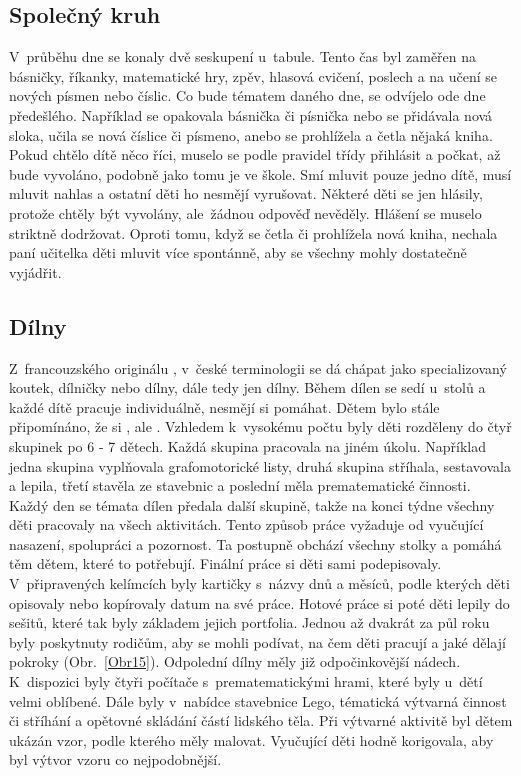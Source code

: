 			\subsection{Společný kruh}
			V průběhu dne se konaly dvě seskupení u~tabule. Tento čas byl zaměřen na básničky, říkanky, matematické hry, zpěv, hlasová cvičení, poslech a na učení se nových písmen nebo číslic. Co bude tématem daného dne, se odvíjelo ode dne předešlého. Například se opakovala básnička či písnička nebo se přidávala nová sloka, učila se nová číslice či písmeno, anebo se prohlížela a četla nějaká kniha. Pokud chtělo dítě něco říci, muselo se podle pravidel třídy přihlásit a počkat, až bude vyvoláno, podobně jako tomu je ve škole. Smí mluvit pouze jedno dítě, musí mluvit nahlas a ostatní děti ho nesmějí vyrušovat. Některé děti se jen hlásily, protože chtěly být vyvolány, ale žádnou odpověď nevěděly. Hlášení se muselo striktně dodržovat. Oproti tomu, když se četla či prohlížela nová kniha, nechala paní učitelka děti mluvit více spontánně, aby se všechny mohly dostatečně vyjádřit.

		\subsection{Dílny}
		\label{dilny}
			Z~francouzského originálu , v~české terminologii se dá chápat jako specializovaný koutek, dílničky nebo dílny, dále tedy jen dílny. 
			Během dílen se sedí u~stolů a každé dítě pracuje individuálně, nesmějí si pomáhat. Dětem bylo stále připomínáno, že si , ale . Vzhledem k~vysokému počtu byly děti rozděleny do čtyř skupinek po 6 - 7 dětech. Každá skupina pracovala na jiném úkolu. Například jedna skupina vyplňovala grafomotorické listy, druhá skupina stříhala, sestavovala a lepila, třetí stavěla ze stavebnic a poslední měla prematematické činnosti. Každý den se témata dílen předala další skupině, takže na konci týdne všechny děti pracovaly na všech aktivitách. Tento způsob práce vyžaduje od vyučující nasazení, spolupráci a pozornost. Ta postupně obchází všechny stolky a pomáhá těm dětem, které to potřebují. Finální práce si děti sami podepisovaly. V~připravených kelímcích byly kartičky s~názvy dnů a měsíců, podle kterých děti opisovaly nebo kopírovaly datum na své práce. Hotové práce si poté děti lepily do sešitů, které tak byly základem jejich portfolia. Jednou až dvakrát za půl roku byly poskytnuty rodičům, aby se mohli podívat, na čem děti pracují a jaké dělají pokroky (Obr.~\ref{Obr15}). Odpolední dílny měly již odpočinkovější nádech. K~dispozici byly čtyři počítače s~prematematickými hrami, které byly u~dětí velmi oblíbené. Dále byly v~nabídce stavebnice Lego, tématická výtvarná činnost či stříhání a opětovné skládání částí lidského těla. Při výtvarné aktivitě byl dětem ukázán vzor, podle kterého měly malovat. Vyučující děti hodně korigovala, aby byl výtvor vzoru co nejpodobnější.


